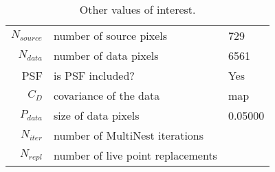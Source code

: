 \begin{table*}[!htb]\caption{Other values of interest.}\begin{center}\begin{tabular}{ r l l }\hline $N_{source}$ & number of source pixels           & 729 \\ 
 $N_{data}$   & number of data pixels             & 6561 \\ 
 PSF & is PSF included?                          & Yes \\
 $C_D$        & covariance of the data            & map \\ 
 $P_{data}$   & size of data pixels               &    0.05000 \\ 
 $N_{iter}$   & number of MultiNest iterations    &  \\ 
 $N_{repl}$   & number of live point replacements &  \\ 
\hline\end{tabular}\end{center}\label{tab:3}\end{table*}